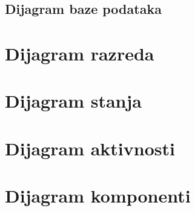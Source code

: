 			\subsection{Dijagram baze podataka}
			
			\eject
			
			
		\section{Dijagram razreda}
		
			
			
			
			
			
			
			
			\eject
		
		\section{Dijagram stanja}
			
			
			
			
			
			\eject 
		
		\section{Dijagram aktivnosti}
			
			
			
			\eject
		\section{Dijagram komponenti}
		
		
